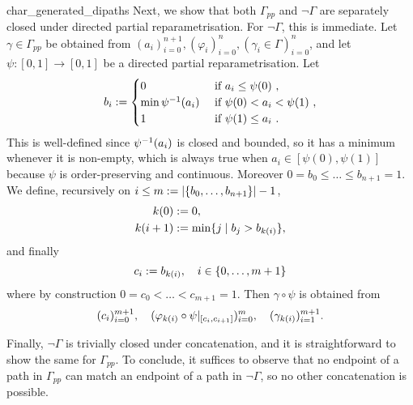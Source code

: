 \begin{lemproof}{char_generated_dipaths}
Next, we show that both \( \Gamma_\textit{pp} \) and \( \neg \Gamma \) are separately closed under directed partial reparametrisation.
For \( \neg \Gamma \), this is immediate.
Let \( \gamma \in \Gamma_\textit{pp} \) be obtained from \( (a_i)_{i=0}^{n+1}, (\varphi_i)_{i=0}^n, (\gamma_i \in \Gamma)_{i=0}^n \), and let \( \psi\colon [0, 1] \to [0, 1] \) be a directed partial reparametrisation.
Let
\begin{equation*}
	b_i := \begin{cases}
		0 & \text{ if \( a_i \leq \psi(0) \) }, \\
		\min {\psi}^{-1}(a_i) & \text{ if \( \psi(0) < a_i < \psi(1) \) }, \\
		1 & \text{ if \( \psi(1) \leq a_i \) }.
	\end{cases}
\end{equation*}
This is well-defined since \( {\psi}^{-1}(a_i) \) is closed and bounded, so it has a minimum whenever it is non-empty, which is always true when \( a_i \in [\psi(0), \psi(1)] \) because \( \psi \) is order-preserving and continuous.
Moreover \( 0 = b_0 \leq \ldots \leq b_{n+1} = 1 \).
We define, recursively on \( i \leq m := | \{b_0, \ldots, b_{n+1} \} | - 1 \),
\begin{align*}
	k(0) & := 0, \\
	k(i+1) & := \min \{ j \mid b_j > b_{k(i)} \},
\end{align*}
and finally 
\begin{equation*}
	c_i := b_{k(i)}, \quad i \in \{0, \dots, m+1\}
\end{equation*}
where by construction \( 0 = c_0 < \ldots < c_{m+1} = 1 \).
Then \( \gamma \circ \psi \) is obtained from
\begin{equation*}
	(c_i)_{i=0}^{m+1}, \quad (\varphi_{k(i)} \circ \restr{\psi}{[c_i, c_{i+1}]})_{i=0}^m, \quad (\gamma_{k(i)})_{i=1}^{m+1}.
\end{equation*}

Finally, \( \neg \Gamma \) is trivially closed under concatenation, and it is straightforward to show the same for \( \Gamma_\textit{pp} \).
To conclude, it suffices to observe that no endpoint of a path in \( \Gamma_\textit{pp} \) can match an endpoint of a path in \( \neg \Gamma \), so no other concatenation is possible.
\end{lemproof}

